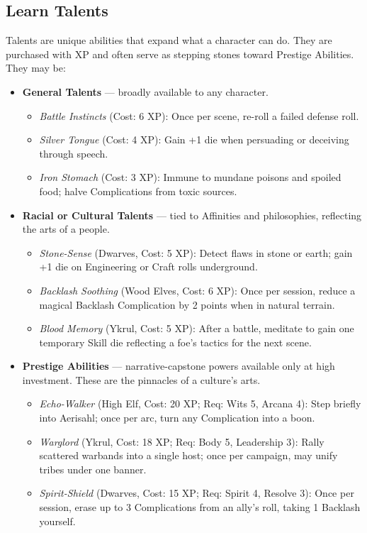 \documentclass[12pt]{book}
\begin{document}
\subsection{Learn Talents}
Talents are unique abilities that expand what a character can do. They are purchased with XP and often serve as stepping stones toward Prestige Abilities. They may be:

\begin{itemize}
  \item \textbf{General Talents} — broadly available to any character.  
  \begin{itemize}
    \item \emph{Battle Instincts} (Cost: 6 XP): Once per scene, re-roll a failed defense roll.  
    \item \emph{Silver Tongue} (Cost: 4 XP): Gain +1 die when persuading or deceiving through speech.  
    \item \emph{Iron Stomach} (Cost: 3 XP): Immune to mundane poisons and spoiled food; halve Complications from toxic sources.  
  \end{itemize}

  \item \textbf{Racial or Cultural Talents} — tied to Affinities and philosophies, reflecting the arts of a people.  
  \begin{itemize}
    \item \emph{Stone-Sense} (Dwarves, Cost: 5 XP): Detect flaws in stone or earth; gain +1 die on Engineering or Craft rolls underground.  
    \item \emph{Backlash Soothing} (Wood Elves, Cost: 6 XP): Once per session, reduce a magical Backlash Complication by 2 points when in natural terrain.  
    \item \emph{Blood Memory} (Ykrul, Cost: 5 XP): After a battle, meditate to gain one temporary Skill die reflecting a foe’s tactics for the next scene.  
  \end{itemize}

  \item \textbf{Prestige Abilities} — narrative-capstone powers available only at high investment. These are the pinnacles of a culture’s arts.  
  \begin{itemize}
    \item \emph{Echo-Walker} (High Elf, Cost: 20 XP; Req: Wits 5, Arcana 4): Step briefly into Aerisahl; once per arc, turn any Complication into a boon.  
    \item \emph{Warglord} (Ykrul, Cost: 18 XP; Req: Body 5, Leadership 3): Rally scattered warbands into a single host; once per campaign, may unify tribes under one banner.  
    \item \emph{Spirit-Shield} (Dwarves, Cost: 15 XP; Req: Spirit 4, Resolve 3): Once per session, erase up to 3 Complications from an ally’s roll, taking 1 Backlash yourself.  
  \end{itemize}
\end{itemize}
\end{document}
